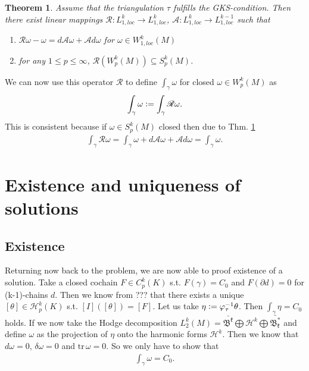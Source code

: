 \documentclass[12pt,a4paper]{article}
\newtheorem{theorem}{Theorem}
\theoremstyle{definition}
\newcommand{\rop}{\mathscr{R}} %
\begin{document}
\begin{theorem}\label{operators}
    Assume that the triangulation $\tau$ fulfills the GKS-condition.
    Then there exist linear mappings $\mathscr{R}: L^k_{1,loc} \rightarrow 
    L^k_{1,loc}$, $\mathscr{A}: L^k_{1,loc} \rightarrow L^{k-1}_{1,loc}$ 
    such that
    \begin{enumerate}
        \item $\mathscr{R}\omega - \omega = 
            d\mathscr{A}\omega + \mathscr{A}d\omega$ for 
            $\omega \in W^k_{1,loc}(M)$
        \item for any $1 \leq p \leq \infty$, 
            $\rop(W^k_p(M)) \subseteq S^k_p(M)$.
    \end{enumerate}
\end{theorem}

We can now use this operator $\rop$ to define $\int_\gamma \omega$ for closed
$\omega \in W^k_p(M)$ as
\begin{align*}
\int_\gamma \omega \vcentcolon= \int_\gamma \rop\omega.
\end{align*}
This is consistent because if $\omega \in S^k_p(M)$ closed then due to 
Thm. \ref{operators}
\begin{align*}
\int_\gamma \rop\omega = 
\int_\gamma \omega + d\mathscr{A}\omega + \mathscr{A}d\omega = 
\int_\gamma \omega.
\end{align*}

\section{Existence and uniqueness of solutions}
\subsection{Existence}

Returning now back to the problem, we are now able to proof existence of a 
solution. Take a closed cochain $F \in C^k_p(K)$ s.t. $F(\gamma) = C_0$ and 
$F(\partial d) = 0$ for (k-1)-chains $d$. Then we know from ??? that 
there exists a unique $[\theta] \in \mathscr{H}_p^k(K)$ s.t. 
$[I]([\theta]) = [F]$. Let us take $\eta \vcentcolon= 
\varphi_\tau^{-1} \theta$. Then $\int_\gamma \eta = C_0$ holds. If we now take
the Hodge decomposition
$L^k_2(M) = \bar{\mathfrak{B^k}} \bigoplus \mathcal{H}^k \bigoplus
\bar{\mathfrak{B^*_k}}$ and define $\omega$ as the projection of $\eta$ onto the
harmonic forms $\mathcal{H}^k$. Then we know that $d\omega = 0$, 
$\delta\omega = 0$ and $\text{tr}\,\omega = 0$. So we only have to show that
\begin{align*}
\int_\gamma \omega = C_0.
\end{align*}
\end{document}
